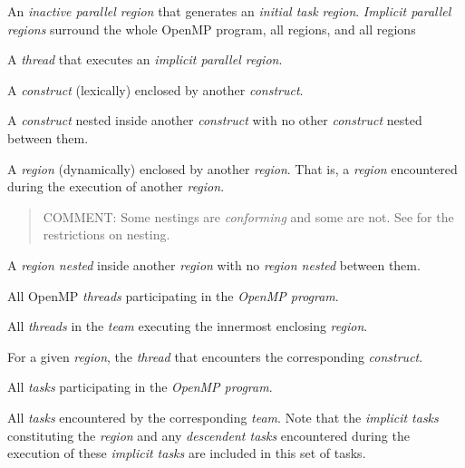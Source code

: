 \glossarydefstart
An \emph{inactive parallel region} that generates an \emph{initial task region}. \emph{Implicit parallel
regions} surround the whole OpenMP program, all  regions, and all 
 regions
\glossarydefend

\glossarydefstart
A \emph{thread} that executes an \emph{implicit parallel region}.
\glossarydefend

\glossarydefstart
A \emph{construct} (lexically) enclosed by another \emph{construct}.
\glossarydefend

\glossarydefstart
A \emph{construct} nested inside another \emph{construct} with no other \emph{construct} nested 
between them.
\glossarydefend

\glossarydefstart
A \emph{region} (dynamically) enclosed by another \emph{region}. That is, a \emph{region} encountered 
during the execution of another \emph{region}.

\begin{quote}
COMMENT: Some nestings are \emph{conforming} and some are not. 
See  for the restrictions on nesting.
\end{quote}
\glossarydefend

\glossarydefstart
A \emph{region nested} inside another \emph{region} with no  \emph{region nested} between 
them. 
\glossarydefend

\glossarydefstart
All OpenMP \emph{threads} participating in the \emph{OpenMP program}.
\glossarydefend

\glossarydefstart
All \emph{threads} in the \emph{team} executing the innermost enclosing  \emph{region}.
\glossarydefend

\glossarydefstart
For a given \emph{region}, the \emph{thread} that encounters the 
corresponding \emph{construct}.
\glossarydefend

\glossarydefstart
All \emph{tasks} participating in the \emph{OpenMP program}. 
\glossarydefend

\glossarydefstart
All \emph{tasks} encountered by the corresponding \emph{team}. Note that the \emph{implicit tasks}
constituting the  \emph{region} and any \emph{descendent tasks} encountered during 
the execution of these \emph{implicit tasks} are included in this set of tasks. 
\glossarydefend

